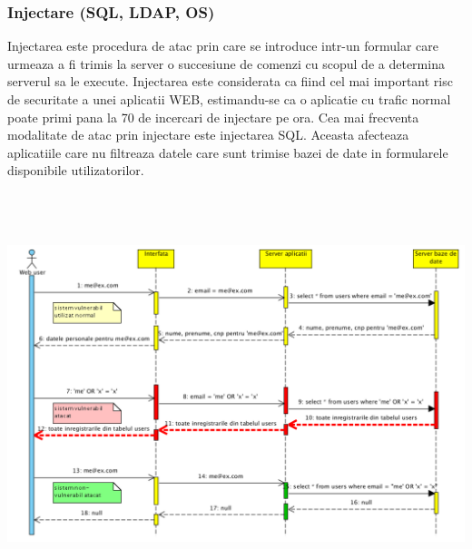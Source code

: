 \subsubsection{Injectare (SQL, LDAP, OS) }

Injectarea este procedura de atac prin care se introduce intr-un formular care urmeaza a fi trimis la server o
succesiune de comenzi cu scopul de a determina serverul sa le execute. Injectarea este considerata ca fiind cel mai
important risc de securitate a unei aplicatii WEB, estimandu-se ca o aplicatie cu trafic normal poate primi pana la 70
de incercari de injectare pe ora. Cea mai frecventa modalitate de atac prin injectare este injectarea SQL. Aceasta
afecteaza aplicatiile care nu filtreaza datele care sunt trimise bazei de date in formularele disponibile
utilizatorilor.

 \includegraphics[width=7.1146in,height=4.6146in]{SecuritateaarhiveiRODA-img003.png} 

